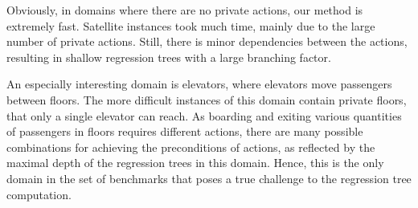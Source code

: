 \documentclass[letterpaper]{article}
\theoremstyle{definition}
\begin{document}
Obviously, in domains where there are no private actions, our method is extremely fast.
Satellite instances took much time, mainly due to the large number of private actions. Still, there is minor dependencies between the actions, resulting in shallow regression trees with a large branching factor.

\begin{table}[t!]
\centering
\footnotesize
{}
\caption{Projection computation metrics over a large problem from each domain.}
\label{tbl:projection}
\end{table}


An especially interesting domain is elevators, where elevators move passengers between floors. The more difficult instances of this domain contain private floors, that only a single elevator can reach. As boarding and exiting various quantities of passengers in floors requires different actions,  there are many possible combinations for achieving the preconditions of actions, as reflected by the maximal depth of the regression trees in this domain. Hence, this is the only domain in the set of benchmarks that poses a true challenge to the regression tree computation.
\end{document}
